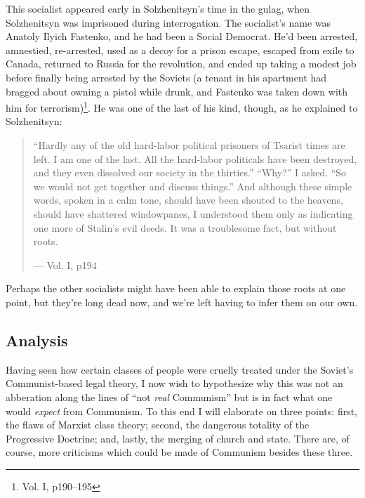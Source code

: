 \documentclass{article}
\begin{document}
This socialist appeared early in Solzhenitsyn's time in the gulag, when Solzhenitsyn was imprisoned during interrogation.  The socialist's name was Anatoly Ilyich Fastenko, and he had been a Social Democrat.  He'd been arrested, amnestied, re-arrested, used as a decoy for a prison escape, escaped from exile to Canada, returned to Russia for the revolution, and ended up taking a modest job before finally being arrested by the Soviets (a tenant in his apartment had bragged about owning a pistol while drunk, and Fastenko was taken down with him for terrorism)\footnote{Vol. I, p190--195}.  He was one of the last of his kind, though, as he explained to Solzhenitsyn:

\begin{quote}
``Hardly any of the old hard-labor political prisoners of Tsarist times are left.  I am one of the last.  All the hard-labor politicals have been destroyed, and they even dissolved our society in the thirties.''  ``Why?'' I asked.  ``So we would not get together and discuss things.'' And although these simple words, spoken in a calm tone, should have been shouted to the heavens, should have shattered windowpanes, I understood them only as indicating one more of Stalin's evil deeds.  It was a troublesome fact, but without roots.

--- Vol. I, p194
\end{quote}

Perhaps the other socialists might have been able to explain those roots at one point, but they're long dead now, and we're left having to infer them on our own.

\subsection{Analysis}
Having seen how certain classes of people were cruelly treated under the Soviet's Communist-based legal theory, I now wish to hypothesize why this was not an abberation along the lines of ``not \emph{real} Communism'' but is in fact what one would \emph{expect} from Communism.  To this end I will elaborate on three points: first, the flaws of Marxist class theory; second, the dangerous totality of the Progressive Doctrine; and, lastly, the merging of church and state.  There are, of course, more criticisms which could be made of Communism besides these three.
\end{document}
